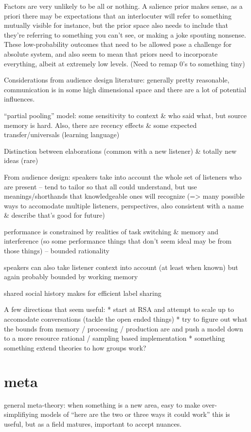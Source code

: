 \documentclass[]{article}
\begin{document}
Factors are very unlikely to be all or nothing. A salience prior makes sense, as a priori there may be expectations that an interlocuter will refer to something mutually visible for instance, but the prior space also needs to include that they're referring to something you can't see, or making a joke spouting nonsense. These low-probability outcomes that need to be allowed pose a challenge for absolute system, and also seem to mean that priors need to incorporate everything, albeit at extremely low levels. (Need to remap 0's to something tiny) 

Considerations from audience design literature: generally pretty reasonable, communication is in some high dimensional space and there are a lot of potential influences. 

``partial pooling'' model: some sensitivity to context \& who said what, but source memory is hard. Also, there are recency effects \& some expected transfer/universals (learning language) 

Distinction between elaborations (common with a new listener) \& totally new ideas (rare)

From audience design: speakers take into account the whole set of listeners who are present -- tend to tailor so that all could understand, but use meanings/shorthands that knowledgeable ones will recognize (=> many possible ways to accomodate multiple listeners, perspectives, also consistent with a name \& describe that's good for future) 

performance is constrained by realities of task switching \& memory and interference (so some performance things that don't seem ideal may be from those things) -- bounded rationality 

speakers can also take listener context into account (at least when known) but again probably bounded by working memory

shared social history makes for efficient label sharing 

A few directions that seem useful:
* start at RSA and attempt to scale up to accomodate conversations (tackle the open ended things)
* try to figure out what the bounds from memory / processing / production are and push a model down to a more resource rational / sampling based implementation
* something something extend theories to how groups work?


\section{meta}
general meta-theory: when something is a new area, easy to make over-simplifiying models of “here are the two or three ways it could work” this is useful, but as a field matures, important to accept nuances.
\end{document}
